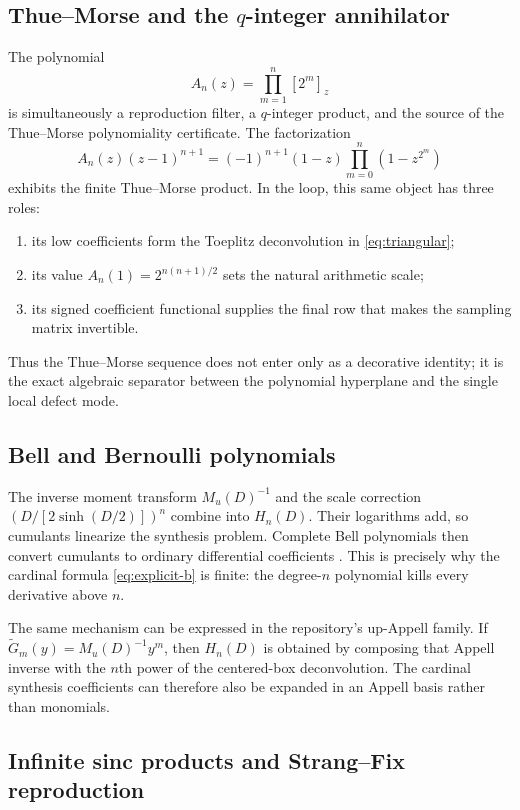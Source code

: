\documentclass[11pt,oneside]{article}
\theoremstyle{definition}
\theoremstyle{remark}
\newcommand{\1}{\mathbf{1}}
\begin{document}
\subsection{Thue--Morse and the \texorpdfstring{$q$}{q}-integer annihilator}

The polynomial
\[
 A_n(z)=\prod_{m=1}^n[2^m]_z
\]
is simultaneously a reproduction filter, a $q$-integer product, and the
source of the Thue--Morse polynomiality certificate.  The factorization
\[
 A_n(z)(z-1)^{n+1}
 =(-1)^{n+1}(1-z)\prod_{m=0}^n(1-z^{2^m})
\]
exhibits the finite Thue--Morse product.  In the loop, this same object has
three roles:

\begin{enumerate}
\item its low coefficients form the Toeplitz deconvolution in
\eqref{eq:triangular};
\item its value $A_n(1)=2^{n(n+1)/2}$ sets the natural arithmetic scale;
\item its signed coefficient functional supplies the final row that makes the
sampling matrix invertible.
\end{enumerate}

Thus the Thue--Morse sequence does not enter only as a decorative identity;
it is the exact algebraic separator between the polynomial hyperplane and the
single local defect mode.

\subsection{Bell and Bernoulli polynomials}

The inverse moment transform $M_u(D)^{-1}$ and the scale correction
$(D/[2\sinh(D/2)])^n$ combine into $H_n(D)$.  Their logarithms add, so
cumulants linearize the synthesis problem.  Complete Bell polynomials then
convert cumulants to ordinary differential coefficients \cite{Comtet}.  This is precisely
why the cardinal formula \eqref{eq:explicit-b} is finite: the degree-$n$
polynomial kills every derivative above $n$.

The same mechanism can be expressed in the repository's up-Appell family.
If $\widetilde G_m(y)=M_u(D)^{-1}y^m$, then $H_n(D)$ is obtained by composing
that Appell inverse with the $n$th power of the centered-box deconvolution.
The cardinal synthesis coefficients can therefore also be expanded in an
Appell basis rather than monomials.

\subsection{Infinite sinc products and Strang--Fix reproduction}
\end{document}
